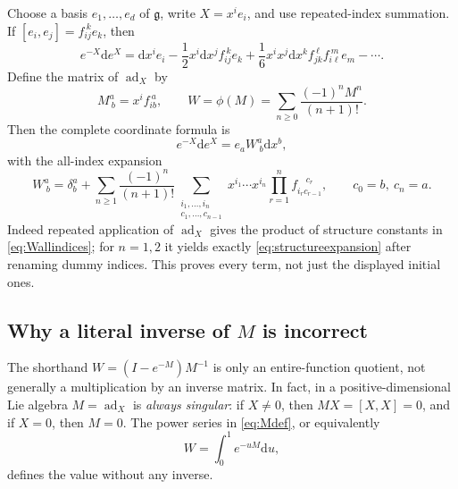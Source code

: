 \documentclass[11pt]{article}
\theoremstyle{definition}
\theoremstyle{remark}
\newcommand{\g}{\mathfrak g}
\newcommand{\dd}{\mathrm d}
\newcommand{\ad}{\operatorname{ad}}
\numberwithin{equation}{section}
\begin{document}
Choose a basis $e_1,\ldots,e_d$ of $\g$, write $X=x^ie_i$, and use repeated-index summation. If $[e_i,e_j]=f_{ij}^{\ k}e_k$, then
\begin{equation}\label{eq:structureexpansion}
 e^{-X}\dd e^X=\dd x^ie_i-\frac12x^i\dd x^jf_{ij}^{\ k}e_k
    +\frac16x^ix^j\dd x^kf_{jk}^{\ \ell}f_{i\ell}^{\ m}e_m-\cdots.
\end{equation}
Define the matrix of $\ad_X$ by
\begin{equation}\label{eq:Mdef}
 M^a_{\ b}=x^if_{ib}^{\ a},\qquad
 W=\phi(M)=\sum_{n\geq0}\frac{(-1)^nM^n}{(n+1)!}.
\end{equation}
Then the complete coordinate formula is
\begin{equation}\label{eq:Wcoordinates}
 e^{-X}\dd e^X=e_aW^a_{\ b}\dd x^b,
\end{equation}
with the all-index expansion
\begin{equation}\label{eq:Wallindices}
 W^a_{\ b}=\delta^a_b+
 \sum_{n\geq1}\frac{(-1)^n}{(n+1)!}
 \sum_{\substack{i_1,\ldots,i_n\\c_1,\ldots,c_{n-1}}}
       x^{i_1}\cdots x^{i_n}
       \prod_{r=1}^{n}f_{i_rc_{r-1}}^{\quad c_r},
 \qquad c_0=b,\ c_n=a.
\end{equation}
Indeed repeated application of $\ad_X$ gives the product of structure constants in \eqref{eq:Wallindices}; for $n=1,2$ it yields exactly \eqref{eq:structureexpansion} after renaming dummy indices. This proves every term, not just the displayed initial ones.

\subsection{Why a literal inverse of \texorpdfstring{$M$}{M} is incorrect}
The shorthand $W=(I-e^{-M})M^{-1}$ is only an entire-function quotient, not generally a multiplication by an inverse matrix. In fact, in a positive-dimensional Lie algebra $M=\ad_X$ is \emph{always singular}: if $X\ne0$, then $MX=[X,X]=0$, and if $X=0$, then $M=0$. The power series in \eqref{eq:Mdef}, or equivalently
\begin{equation}\label{eq:Wintegral}
 W=\int_0^1e^{-uM}\dd u,
\end{equation}
defines the value without any inverse.
\end{document}
